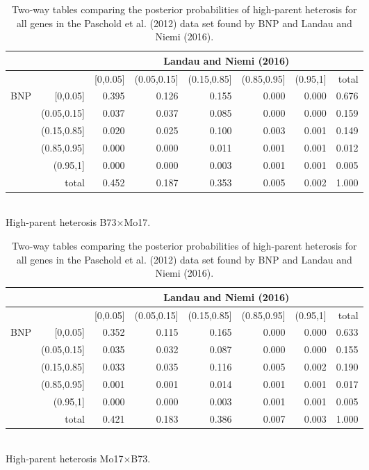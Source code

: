 \begin{table}[ht]
\footnotesize
\centering
\caption{Two-way tables comparing the posterior probabilities of high-parent heterosis for all genes in the Paschold et al. (2012) data set found by BNP and Landau and Niemi (2016).}
\label{bayes-compare2}
   \begin{tabular}{rrrrrrr|r}
&  &\multicolumn{6}{c}{Landau and Niemi (2016)}\\
  \toprule
&  & [0,0.05] & (0.05,0.15] & (0.15,0.85] & (0.85,0.95] & (0.95,1] & total \\
  \midrule
\multirow{6}{*}{BNP} & [0,0.05] & 0.395 & 0.126 & 0.155 & 0.000 & 0.000 & 0.676 \\
                     & (0.05,0.15] & 0.037 & 0.037 & 0.085 & 0.000 & 0.000 & 0.159 \\
                     & (0.15,0.85] & 0.020 & 0.025 & 0.100 & 0.003 & 0.001 & 0.149 \\
                     & (0.85,0.95] & 0.000 & 0.000 & 0.011 & 0.001 & 0.001 & 0.012 \\
                     & (0.95,1] & 0.000 & 0.000 & 0.003 & 0.001 & 0.001 & 0.005 \\
                     \midrule
                     & total & 0.452 & 0.187 & 0.353 & 0.005 & 0.002 & 1.000 \\
   \bottomrule
\end{tabular}
\\[.5cm]
High-parent heterosis B73$\times$Mo17.
\\[.75cm]

\begin{tabular}{rrrrrrr|r}
&  &\multicolumn{6}{c}{Landau and Niemi (2016)}\\
  \toprule
&  & [0,0.05] & (0.05,0.15] & (0.15,0.85] & (0.85,0.95] & (0.95,1] & total \\
  \midrule
\multirow{6}{*}{BNP} & [0,0.05] & 0.352 & 0.115 & 0.165 & 0.000 & 0.000 & 0.633 \\
                     & (0.05,0.15] & 0.035 & 0.032 & 0.087 & 0.000 & 0.000 & 0.155 \\
                     & (0.15,0.85] & 0.033 & 0.035 & 0.116 & 0.005 & 0.002 & 0.190 \\
                     & (0.85,0.95] & 0.001 & 0.001 & 0.014 & 0.001 & 0.001 & 0.017 \\
                     & (0.95,1] & 0.000 & 0.000 & 0.003 & 0.001 & 0.001 & 0.005 \\
                     \midrule
                     & total & 0.421 & 0.183 & 0.386 & 0.007 & 0.003 & 1.000 \\
   \bottomrule
\end{tabular}
\\[.5cm]
High-parent heterosis Mo17$\times$B73.
\end{table}


